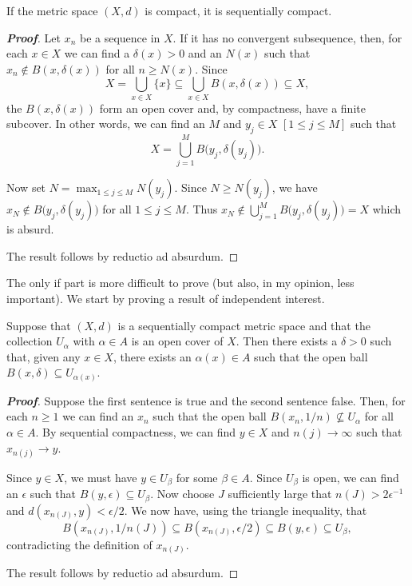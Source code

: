 \begin{theorem}\label{T;compact implies sequence}
If the metric space $(X,d)$ is compact, it is sequentially compact.
\end{theorem}
\begin{proof}[\bf Proof] Let $x_{n}$ be a sequence in $X$. If it has no convergent subsequence, then, for each $x\in X$ we can find a $\delta(x)>0$ and an $N(x)$ such that $x_{n}\notin B(x,\delta(x))$ for all $n\geq N(x)$. Since
\[X=\bigcup_{x\in X}\{x\} \subseteq\bigcup_{x\in X}B(x,\delta(x))\subseteq X,\]
the $B(x,\delta(x))$ form an open cover and, by compactness,
have a finite subcover. In other words, we can find
an $M$ and $y_{j}\in X$ $[1\leq j\leq M]$ such that
\[X=\bigcup_{j=1}^{M}B\big(y_{j},\delta(y_{j})\big).\]

Now set $N=\max_{1\leq j\leq M}N(y_{j})$. Since
$N\geq N(y_{j})$, we have
$x_{N}\notin B\big(y_{j},\delta(y_{j})\big)$
for all $1\leq j\leq M$. Thus
$x_{N}\notin\bigcup_{j=1}^{M}B\big(y_{j},\delta(y_{j})\big)
=X$ which is absurd.

The result follows by reductio ad absurdum.
\end{proof}


The only if part is more difficult to prove (but also, in my opinion, less important). We start by proving a result of independent interest.


\begin{lemma}\label{L;Lebesgue}
Suppose that $(X,d)$ is a sequentially compact
metric space and that the collection $U_{\alpha}$
with $\alpha\in A$ is an open cover of $X$.
Then there exists a $\delta>0$ such that, given any
$x\in X$, there exists an $\alpha(x)\in A$
such that the open ball $B(x,\delta)\subseteq U_{\alpha(x)}$.
\end{lemma}
\begin{proof}[\bf Proof] Suppose the first sentence is true and the
second sentence false. Then, for each $n\geq 1$
we can find an $x_{n}$ such that the open ball
$B(x_{n},1/n)\not\subseteq U_{\alpha}$
for all $\alpha\in A$. By sequential compactness,
we can find $y\in X$ and $n(j)\rightarrow\infty$
such that $x_{n(j)}\rightarrow y$.

Since $y\in X$, we must have $y\in U_{\beta}$
for some $\beta\in A$. Since $U_{\beta}$ is open,
we can find an $\epsilon$ such that
$B(y,\epsilon)\subseteq U_{\beta}$.
Now choose $J$ sufficiently large that $n(J)>2\epsilon^{-1}$
and $d(x_{n(J)},y)<\epsilon/2$. We now have,
using the triangle inequality, that
\[B(x_{n(J)},1/n(J))\subseteq B(x_{n(J)},\epsilon/2)
\subseteq B(y,\epsilon)\subseteq U_{\beta},\]
contradicting the definition of $x_{n(J)}$.

The result follows by reductio ad absurdum.
\end{proof}

